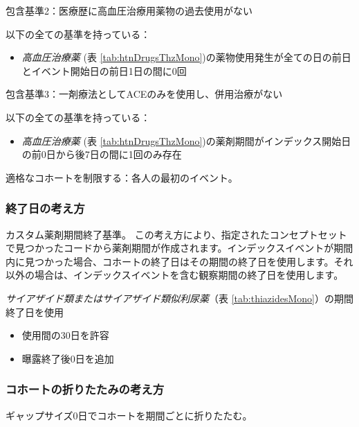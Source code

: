 \documentclass[
  11pt]{book}
\providecommand{\tightlist}{%
  \setlength{\itemsep}{0pt}\setlength{\parskip}{0pt}}
\theoremstyle{definition}
\theoremstyle{definition}
\theoremstyle{definition}
\theoremstyle{definition}
\theoremstyle{remark}
\begin{document}
包含基準2：医療歴に高血圧治療用薬物の過去使用がない

以下の全ての基準を持っている：

\begin{itemize}
\tightlist
\item
  \emph{高血圧治療薬} (表 \ref{tab:htnDrugsThzMono})の薬物使用発生が全ての日の前日とイベント開始日の前日1日の間に0回
\end{itemize}

包含基準3：一剤療法としてACEのみを使用し、併用治療がない

以下の全ての基準を持っている：

\begin{itemize}
\tightlist
\item
  \emph{高血圧治療薬} (表 \ref{tab:htnDrugsThzMono})の薬剤期間がインデックス開始日の前0日から後7日の間に1回のみ存在
\end{itemize}

適格なコホートを制限する：各人の最初のイベント。

\subsubsection*{終了日の考え方}\label{ux7d42ux4e86ux65e5ux306eux8003ux3048ux65b9-2}

カスタム薬剤期間終了基準。
この考え方により、指定されたコンセプトセットで見つかったコードから薬剤期間が作成されます。インデックスイベントが期間内に見つかった場合、コホートの終了日はその期間の終了日を使用します。それ以外の場合は、インデックスイベントを含む観察期間の終了日を使用します。

\emph{サイアザイド類またはサイアザイド類似利尿薬}（表 \ref{tab:thiazidesMono}）の期間終了日を使用

\begin{itemize}
\tightlist
\item
  使用間の30日を許容
\item
  曝露終了後0日を追加
\end{itemize}

\subsubsection*{コホートの折りたたみの考え方}\label{ux30b3ux30dbux30fcux30c8ux306eux6298ux308aux305fux305fux307fux306eux8003ux3048ux65b9-1}

ギャップサイズ0日でコホートを期間ごとに折りたたむ。
\end{document}
